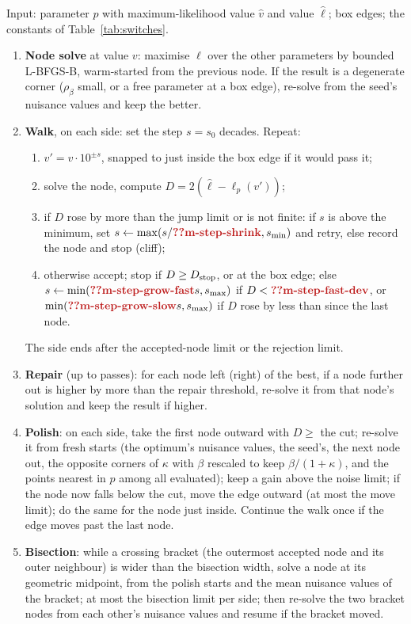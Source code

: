 Input: parameter $p$ with maximum-likelihood value $\hat v$ and value $\hat\ell$; box edges; the constants of Table~\ref{tab:switches}.
\begin{enumerate}[leftmargin=2em,itemsep=1pt]
  \item \textbf{Node solve} at value $v$: maximise $\ell$ over the other parameters by bounded L-BFGS-B, warm-started from the previous node. If the result is a degenerate corner ($\rho_\beta$ small, or a free parameter at a box edge), re-solve from the seed's nuisance values and keep the better.
  \item \textbf{Walk}, on each side: set the step $s=s_0$ decades. Repeat:
  \begin{enumerate}[label=(\alph*),leftmargin=1.6em,itemsep=0pt]
    \item $v'=v\cdot10^{\pm s}$, snapped to just inside the box edge if it would pass it;
    \item solve the node, compute $D=2(\hat\ell-\ell_p(v'))$;
    \item if $D$ rose by more than the jump limit or is not finite: if $s$ is above the minimum, set $s\leftarrow\max(s/\C{m-step-shrink},s_{\min})$ and retry, else record the node and stop (cliff);
    \item otherwise accept; stop if $D\ge D_{\rm stop}$, or at the box edge; else $s\leftarrow\min(\C{m-step-grow-fast}s,s_{\max})$ if $D<\C{m-step-fast-dev}$, or $\min(\C{m-step-grow-slow}s,s_{\max})$ if $D$ rose by less than  since the last node.
  \end{enumerate}
  The side ends after the accepted-node limit or the rejection limit.
  \item \textbf{Repair} (up to  passes): for each node left (right) of the best, if a node further out is higher by more than the repair threshold, re-solve it from that node's solution and keep the result if higher.
  \item \textbf{Polish}: on each side, take the first node outward with $D\ge$ the cut; re-solve it from fresh starts (the optimum's nuisance values, the seed's, the next node out, the opposite corners of $\kappa$ with $\beta$ rescaled to keep $\beta/(1+\kappa)$, and the points nearest in $p$ among all evaluated); keep a gain above the noise limit; if the node now falls below the cut, move the edge outward (at most the move limit); do the same for the node just inside. Continue the walk once if the edge moves past the last node.
  \item \textbf{Bisection}: while a crossing bracket (the outermost accepted node and its outer neighbour) is wider than the bisection width, solve a node at its geometric midpoint, from the polish starts and the mean nuisance values of the bracket; at most the bisection limit per side; then re-solve the two bracket nodes from each other's nuisance values and resume if the bracket moved.

\end{enumerate}
